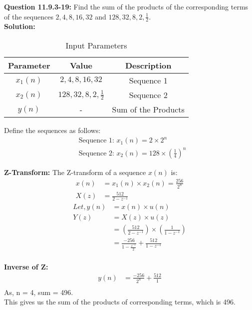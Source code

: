 \documentclass[journal,12pt,twocolumn]{IEEEtran}
\theoremstyle{remark}
\begin{document}
\title{}
\author{Sasa Mardi, EE23BTECH11222}
\date{}
\maketitle
\textbf{Question 11.9.3-19:} Find the sum of the products of the corresponding terms of the sequences $2, 4, 8, 16, 32$ and $128, 32, 8, 2, \frac{1}{2}$.\\
\textbf{Solution:}
\begin{table}[h!]
    \centering
    \caption{Input Parameters}
    \label{tab:1}
    \begin{tabular}{ | c | c | c | }
        \hline
        Parameter & Value & Description \\
        \hline
        $x_1(n)$ & $2, 4, 8, 16, 32$ &  Sequence 1 \\
        \hline
        $x_2(n)$ & $128, 32, 8, 2, \frac{1}{2}$ &  Sequence 2 \\
        \hline
        $y(n)$ & - &  Sum of the Products \\
        \hline
    \end{tabular}
\end{table}
Define the sequences as follows:\\
\begin{align}
&\text{Sequence 1: } x_1(n) = 2 \times 2^n \\
&\text{Sequence 2: } x_2(n) = 128 \times \left(\frac{1}{4}\right)^n
\end{align}

\textbf{Z-Transform:}
The Z-transform of a sequence \( x(n) \) is:
\begin{align}
x(n) &= x_1(n) \times x_2(n) = \frac{256}{2^{n}} \\
X(z) &= \frac{512}{2 - z^{-1}}
\end{align}
\begin{align}
Let, y(n) &= x(n) \times u(n) \\
 Y(z) &= X(z) \times u(z) \\
 &= \left(\frac{512}{2 - z^{-1}}\right) \times \left(\frac{1}{1 - z^{-1}}\right)\\
 &= \frac{-256}{1 - \frac{z^{-1}}{2}} + \frac{512}{1 - z^{-1}}\\
\end{align}

\textbf{Inverse of Z:} \\
\begin{align}
y(n) &= \frac{-256}{2^{n}} + \frac{512}{1} \\
\end{align}
As, n = 4, sum = 496. \\
This gives us the sum of the products of corresponding terms, which is 496.
\end{document}

